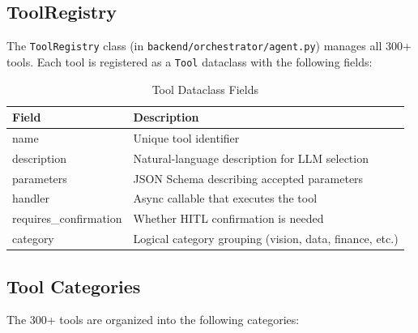 \documentclass[12pt,a4paper,twoside]{report}
\begin{document}
\subsection{ToolRegistry}

The \texttt{ToolRegistry} class (in \texttt{backend/orchestrator/agent.py}) manages all 300+ tools. Each tool is registered as a \texttt{Tool} dataclass with the following fields:

\begin{table}[H]
\centering
{}
\begin{tabularx}{\textwidth}{|l|X|}
\hline
\rowcolor{phiblue!20}
\textbf{Field} & \textbf{Description} \\
\hline
name & Unique tool identifier \\
\hline
description & Natural-language description for LLM selection \\
\hline
parameters & JSON Schema describing accepted parameters \\
\hline
handler & Async callable that executes the tool \\
\hline
requires\_confirmation & Whether HITL confirmation is needed \\
\hline
category & Logical category grouping (vision, data, finance, etc.) \\
\hline
\end{tabularx}
\caption{Tool Dataclass Fields}
\end{table}

\subsection{Tool Categories}

The 300+ tools are organized into the following categories:
\end{document}
